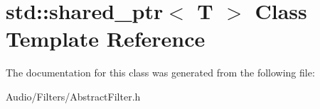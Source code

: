 \hypertarget{classstd_1_1shared__ptr}{\section{std\-:\-:shared\-\_\-ptr$<$ T $>$ Class Template Reference}
\label{classstd_1_1shared__ptr}
}


The documentation for this class was generated from the following file\-:\begin{DoxyCompactItemize}
\item 
Audio/\-Filters/Abstract\-Filter.\-h\end{DoxyCompactItemize}

